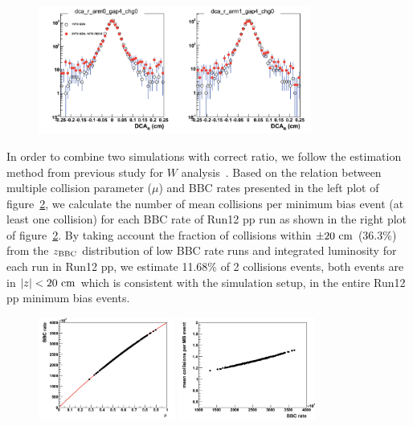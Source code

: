 \documentclass[12pt]{article}
\begin{document}
\begin{figure}[h]
\begin{center}
\includegraphics[width=0.8\textwidth,angle=0]{figures/dca_r_1vtx_2vtx_1miss}
\\ \caption{}
\label{fig:FvtxZ_2nd}
\end{center}
\end{figure}

In order to combine two simulations with correct ratio, we follow the estimation method from previous study for $W$ analysis~\cite{ref:an1103}. Based on the relation between multiple collision parameter ($\mu$) and BBC rates presented in the left plot of figure~\ref{fig:multi_collision}, we calculate the number of mean collisions per minimum bias event (at least one collision) for each BBC rate of Run12 pp run as shown in the right plot of figure~\ref{fig:multi_collision}. By taking account the fraction of collisions within $\pm20~{\rm cm}$ (36.3\%) from the $z_{\rm BBC}$ distribution of low BBC rate runs and integrated luminosity for each run in Run12 pp, we estimate 11.68\% of 2 collisions events, both events are in $|z|<20~{\rm cm}$ which is consistent with the simulation setup, in the entire Run12 pp minimum bias events.

\begin{figure}[h]
\begin{center}
\includegraphics[width=0.4\textwidth,angle=0]{figures/multi_collision_par_BBC_rate}
\includegraphics[width=0.4\textwidth,angle=0]{figures/mean_collision_per_BBC_rate}
\\ \caption{}
\label{fig:multi_collision}
\end{center}
\end{figure}
\end{document}
